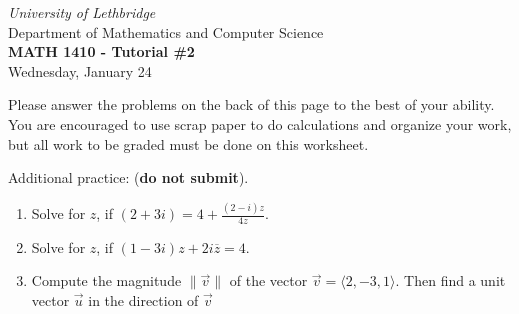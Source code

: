 \documentclass[12pt]{article}
\newcommand{\skipline}{\vspace{12pt}}
\newcommand{\len}[1]{\lVert #1\rVert}
\begin{document}
\author{Instructor: Sean Fitzpatrick}
\thispagestyle{empty}
\begin{center}
\emph{University of Lethbridge}\\
Department of Mathematics and Computer Science\\
{\bf MATH 1410 - Tutorial \#2}\\
Wednesday, January 24
\end{center}
\skipline \skipline \skipline \noindent \skipline

\vspace*{\fill}


Please answer the problems on the back of this page to the best of your ability. You are encouraged to use scrap paper to do calculations and organize your work, but all work to be graded must be done on this worksheet.

\bigskip

Additional practice: (\textbf{do not submit}).
\begin{enumerate}
\item Solve for $z$, if $(2+3i)=4+\frac{(2-i)z}{4z}$.
\item Solve for $z$, if $(1-3i)z+2i\overline{z}=4$.
\item Compute the magnitude $\len{\vec{v}}$ of the vector $\vec{v}=\langle 2,-3,1\rangle$. Then find a unit vector $\vec{u}$ in the direction of $\vec{v}$
\end{enumerate}

\newpage
\end{document}
